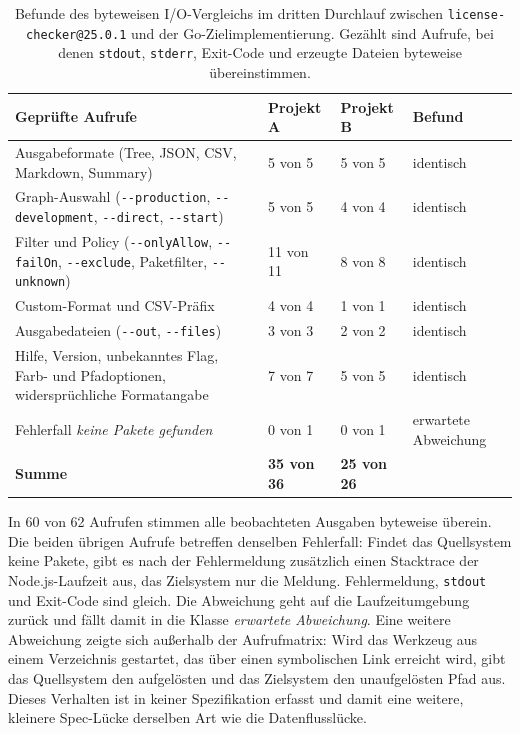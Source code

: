 \begin{table}[H]
\centering
\begin{small}
\begin{tabular}{|p{6.4cm}|p{2.0cm}|p{2.2cm}|p{2.6cm}|}
\hline
\textbf{Geprüfte Aufrufe} & \textbf{Projekt A} & \textbf{Projekt B} & \textbf{Befund} \\
\hline
Ausgabeformate (Tree, JSON, CSV, Markdown, Summary) & 5 von 5 & 5 von 5 & identisch \\
\hline
Graph-Auswahl (\texttt{-{}-production}, \texttt{-{}-development}, \texttt{-{}-direct}, \texttt{-{}-start}) & 5 von 5 & 4 von 4 & identisch \\
\hline
Filter und Policy (\texttt{-{}-onlyAllow}, \texttt{-{}-failOn}, \texttt{-{}-exclude}, Paketfilter, \texttt{-{}-unknown}) & 11 von 11 & 8 von 8 & identisch \\
\hline
Custom-Format und CSV-Präfix & 4 von 4 & 1 von 1 & identisch \\
\hline
Ausgabedateien (\texttt{-{}-out}, \texttt{-{}-files}) & 3 von 3 & 2 von 2 & identisch \\
\hline
Hilfe, Version, unbekanntes Flag, Farb- und Pfadoptionen, widersprüchliche Formatangabe & 7 von 7 & 5 von 5 & identisch \\
\hline
Fehlerfall \emph{keine Pakete gefunden} & 0 von 1 & 0 von 1 & erwartete Abweichung \\
\hline
\textbf{Summe} & \textbf{35 von 36} & \textbf{25 von 26} & \\
\hline
\end{tabular}
\end{small}
\caption{Befunde des byteweisen I/O-Vergleichs im dritten Durchlauf zwischen \texttt{license-checker@25.0.1} und der Go-Zielimplementierung. Gezählt sind Aufrufe, bei denen \texttt{stdout}, \texttt{stderr}, Exit-Code und erzeugte Dateien byteweise übereinstimmen.}
\label{tab:io-befunde-3}
\end{table}

In 60 von 62 Aufrufen stimmen alle beobachteten Ausgaben byteweise überein. Die beiden übrigen Aufrufe betreffen denselben Fehlerfall: Findet das Quellsystem keine Pakete, gibt es nach der Fehlermeldung zusätzlich einen Stacktrace der Node.js-Laufzeit aus, das Zielsystem nur die Meldung. Fehlermeldung, \texttt{stdout} und Exit-Code sind gleich. Die Abweichung geht auf die Laufzeitumgebung zurück und fällt damit in die Klasse \emph{erwartete Abweichung}. Eine weitere Abweichung zeigte sich außerhalb der Aufrufmatrix: Wird das Werkzeug aus einem Verzeichnis gestartet, das über einen symbolischen Link erreicht wird, gibt das Quellsystem den aufgelösten und das Zielsystem den unaufgelösten Pfad aus. Dieses Verhalten ist in keiner Spezifikation erfasst und damit eine weitere, kleinere Spec-Lücke derselben Art wie die Datenflusslücke.

